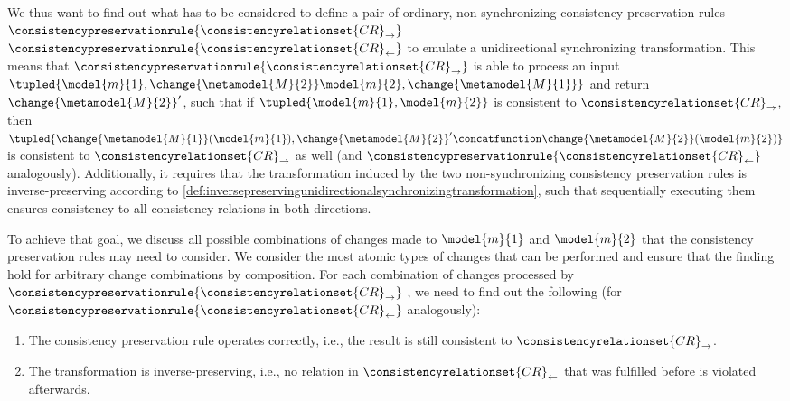 We thus want to find out what has to be considered to define a pair of ordinary, non-synchronizing consistency preservation rules $\consistencypreservationrule{\consistencyrelationset{CR}_{\rightarrow}}$ $\consistencypreservationrule{\consistencyrelationset{CR}_{\leftarrow}}$ to emulate a unidirectional synchronizing transformation.
This means that $\consistencypreservationrule{\consistencyrelationset{CR}_{\rightarrow}}$ is able to process an input $\tupled{\model{m}{1},\change{\metamodel{M}{2}}\model{m}{2},\change{\metamodel{M}{1}}}$ and return $\change{\metamodel{M}{2}}'$, such that if $\tupled{\model{m}{1},\model{m}{2}}$ is consistent to $\consistencyrelationset{CR}_{\rightarrow}$, then $\tupled{\change{\metamodel{M}{1}}(\model{m}{1}),\change{\metamodel{M}{2}}' \concatfunction \change{\metamodel{M}{2}}(\model{m}{2})}$ is consistent to $\consistencyrelationset{CR}_{\rightarrow}$ as well (and $\consistencypreservationrule{\consistencyrelationset{CR}_{\leftarrow}}$ analogously).
Additionally, it requires that the transformation induced by the two non-synchronizing consistency preservation rules is inverse-preserving according to \autoref{def:inversepreservingunidirectionalsynchronizingtransformation}, such that sequentially executing them ensures consistency to all consistency relations in both directions.

To achieve that goal, we discuss all possible combinations of changes made to $\model{m}{1}$ and $\model{m}{2}$ that the consistency preservation rules may need to consider.
We consider the most atomic types of changes that can be performed and ensure that the finding hold for arbitrary change combinations by composition.
For each combination of changes processed by $\consistencypreservationrule{\consistencyrelationset{CR}_{\rightarrow}}$ , we need to find out the following (for $\consistencypreservationrule{\consistencyrelationset{CR}_{\leftarrow}}$ analogously):
\begin{enumerate}
    \item The consistency preservation rule operates correctly, i.e., the result is still consistent to $\consistencyrelationset{CR}_{\rightarrow}$.
    \item The transformation is inverse-preserving, i.e., no relation in $\consistencyrelationset{CR}_{\leftarrow}$ that was fulfilled before is violated afterwards.
\end{enumerate}

